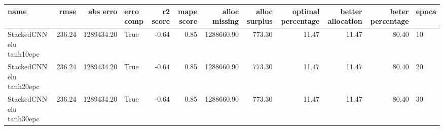 \begin{tabular}{lrrlrrrrrrrl}
\toprule
name & rmse & abs erro & erro comp & r2 score & mape score & alloc missing & alloc surplus & optimal percentage & better allocation & beter percentage & epoca \\
\midrule
StackedCNN elu tanh10epc & 236.24 & 1289434.20 & True & -0.64 & 0.85 & 1288660.90 & 773.30 & 11.47 & 11.47 & 80.40 & 10 \\
StackedCNN elu tanh20epc & 236.24 & 1289434.20 & True & -0.64 & 0.85 & 1288660.90 & 773.30 & 11.47 & 11.47 & 80.40 & 20 \\
StackedCNN elu tanh30epc & 236.24 & 1289434.20 & True & -0.64 & 0.85 & 1288660.90 & 773.30 & 11.47 & 11.47 & 80.40 & 30 \\
\bottomrule
\end{tabular}
